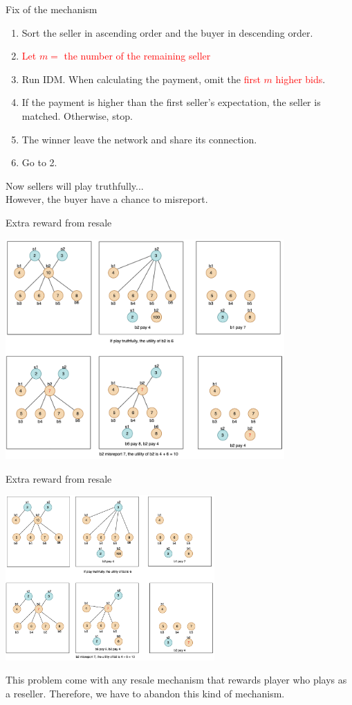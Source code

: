 \documentclass{beamer}
\begin{document}
\begin{frame}{Fix of the mechanism}
	\begin{enumerate}
		\item Sort the seller in ascending order and the buyer in descending order.
		\item \textcolor{red}{Let \(m = \) the number of the remaining seller}
		\item Run IDM. When calculating the payment, omit the \textcolor{red}{first \(m\) higher bids}.
		\item If the payment is higher than the first seller's expectation, the seller is matched.
		      Otherwise, stop.
		\item The winner leave the network and share its connection.
		\item Go to 2.
	\end{enumerate}
	Now sellers will play truthfully...\\\pause
	However, the buyer have a chance to misreport.
\end{frame}
\begin{frame}{Extra reward from resale}
	\begin{center}
		\includegraphics[width=0.8\textwidth]{IDMCounter2}
	\end{center}
\end{frame}
\begin{frame}{Extra reward from resale}
	\begin{center}
		\includegraphics[width=0.6\textwidth]{IDMCounter2}
	\end{center}
	This problem come with any resale mechanism that rewards player who plays as a reseller.
	Therefore, we have to abandon this kind of mechanism.

\end{frame}
\end{document}
